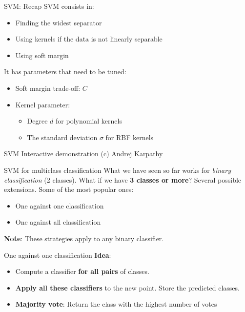 \documentclass{beamer}
\begin{document}
\begin{frame}{SVM: Recap}
SVM consists in:
\begin{itemize}
	\item Finding the widest separator
	\item Using kernels if the data is not linearly separable
	\item Using soft margin 
\end{itemize}
\vfill
It has parameters that need to be tuned:
\begin{itemize}
	\item Soft margin trade-off: $C$
	\item Kernel parameter:
	\begin{itemize}
		\item Degree $d$ for polynomial kernels
		\item The standard deviation $\sigma$ for RBF kernels
	\end{itemize}
\end{itemize}

\end{frame}
%
\begin{frame}{SVM}
\vfill
\Large{Interactive demonstration (c) Andrej Karpathy}
\vfill
\end{frame}
%
\begin{frame}{SVM for multiclass classification}
\vfill
What we have seen so far works for \textit{binary classification} (2 classes). What if we have \textbf{3 classes or more}?
\vfill
\pause 
Several possible extensions. Some of the most popular ones:
\begin{itemize}
	\item One against one classification
	\item One against all classification
\end{itemize}
\vfill
\textbf{Note}: These strategies apply to any binary classifier.
\vfill
\end{frame}
%
\begin{frame}{One against one classification}
\textbf{Idea}: 
\begin{itemize}
	\item Compute a classifier \textbf{for all pairs} of classes.
	\item \textbf{Apply all these classifiers} to the new point. Store the predicted classes.
	\item \textbf{Majority vote}: Return the class with the highest number of votes
\end{itemize}

\end{frame}
\end{document}
